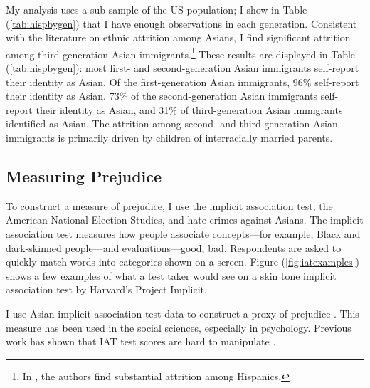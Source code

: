 My analysis uses a sub-sample of the US population; I show in Table (\ref{tab:hispbygen}) that I have enough observations in each generation. Consistent with the literature on ethnic attrition among Asians, I find significant attrition among third-generation Asian immigrants.\footnote{In \textcite{duncanIdentifyingLaterGenerationDescendants2018,duncanSocioeconomicIntegrationImmigrant2018, antmanEthnicAttritionObserved2016,antmanEthnicAttritionAssimilation2020}, the authors find substantial attrition among Hispanics.} These results are displayed in Table (\ref{tab:hispbygen}): most first- and second-generation Asian immigrants self-report their identity as Asian. Of the first-generation Asian immigrants, 96\% self-report their identity as Asian. 73\% of the second-generation Asian immigrants self-report their identity as Asian, and 31\% of third-generation Asian immigrants identified as Asian. The attrition among second- and third-generation Asian immigrants is primarily driven by children of interracially married parents.

\subsection{Measuring Prejudice}

To construct a measure of prejudice, I use the implicit association test, the American National Election Studies, and hate crimes against Asians. The implicit association test measures how people associate concepts---for example, Black and dark-skinned people---and evaluations---good, bad. Respondents are asked to quickly match words into categories shown on a screen. Figure (\ref{fig:iatexamples}) shows a few examples of what a test taker would see on a skin tone implicit association test by Harvard's Project Implicit.

I use Asian implicit association test data to construct a proxy of prejudice \autocite{greenwaldMeasuringIndividualDifferences1998}. This measure has been used in the social sciences, especially in psychology. Previous work has shown that IAT test scores are hard to manipulate \autocite{egloffPredictiveValidityImplicit2002}.

